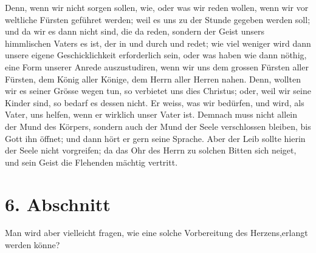   Denn, wenn wir nicht sorgen sollen, wie, oder was wir reden
wollen, wenn wir vor
weltliche Fürsten 
geführet werden; weil es uns zu der Stunde gegeben werden soll; und da wir es
dann nicht sind, die da reden, sondern der Geist unsers himmlischen Vaters es
ist, der in und durch und redet; wie viel weniger wird dann unsere eigene
Geschicklichkeit erforderlich sein, oder was haben wie dann nöthig, eine Form
unserer Anrede
auszustudiren, wenn wir uns dem grossen Fürsten aller Fürsten, dem König aller
Könige, dem Herrn aller Herren nahen. Denn, wollten wir es seiner Grösse wegen
tun, so verbietet uns dies Christus; oder, weil wir seine Kinder sind, so
bedarf es dessen nicht. Er weiss, was wir bedürfen, und wird, als Vater, uns
helfen, wenn er wirklich unser Vater ist. Demnach muss nicht allein der Mund des
Körpers, sondern auch der Mund
der Seele verschlossen bleiben, bis Gott ihn öffnet; und dann hört er gern seine
Sprache. Aber der Leib sollte hierin der Seele nicht vorgreifen; da das Ohr des
Herrn zu solchen Bitten sich neiget, und sein Geist die Flehenden mächtig
vertritt.

\section{6. Abschnitt} \label{kap6_ab6}

Man wird aber vielleicht fragen, wie eine solche Vorbereitung des
Herzens,erlangt werden könne?

\medskip

